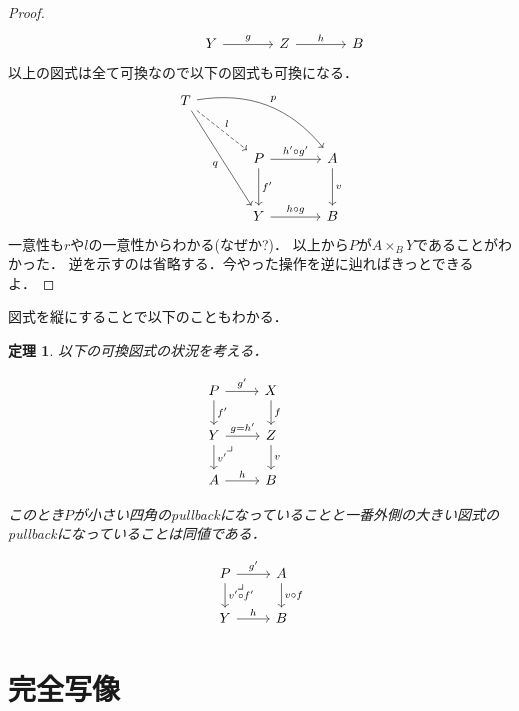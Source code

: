 \documentclass[leqno, a4paper, 12pt, dvipdfmx]{jsarticle}
\newtheorem{thm}{定理}
\begin{document}
\begin{proof}
\[\begin{tikzcd}[column sep=large,row sep=large]
& Y \arrow[r,"g"] & Z \arrow[r,"h"] & B
\end{tikzcd}
\]
以上の図式は全て可換なので以下の図式も可換になる．
\[
\begin{tikzcd}[column sep=large,row sep=large]
T \arrow[dr,dashed,"l"] \arrow[drr, bend left, "p"] \arrow[ddr,"q"'] & & \\
& P \arrow[r,"h'\circ g'"] \arrow[d,"f'"] & A \arrow[d,"v"] \\
& Y \arrow[r,"h\circ g"] & B
\end{tikzcd}
\]
一意性も$r$や$l$の一意性からわかる(なぜか?)．
以上から$P$が$A\times_{B} Y$であることがわかった．
逆を示すのは省略する．今やった操作を逆に辿ればきっとできるよ．
\end{proof}

図式を縦にすることで以下のこともわかる．

\begin{thm}\label{thm:tate}
以下の可換図式の状況を考える．



\[
\begin{tikzcd}
P \arrow[r, "g^{\prime}"] \arrow[d, "f^{\prime}"] & X \arrow[d,"f"] & \\
Y  \arrow[dr, phantom, "\lrcorner", very near start]\arrow[r,"g=h^{\prime}"] \arrow[d,"v^{\prime}"] & Z \arrow[d,"v"] \\
A\arrow[r,"h"] &  B
\end{tikzcd}
\]

このとき$P$が小さい四角のpullbackになっていることと一番外側の大きい図式のpullbackになっていることは同値である．


\[
\begin{tikzcd}
P \arrow[r, "g^{\prime}"] \arrow[d, "v^{\prime}\circ f^{\prime}"] \arrow[dr, phantom, "\lrcorner", very near start]
& A \arrow[d,"v\circ f"] \\
Y \arrow[r,"h"] & B
\end{tikzcd}
\]

\end{thm}





\section{完全写像}
\end{document}
